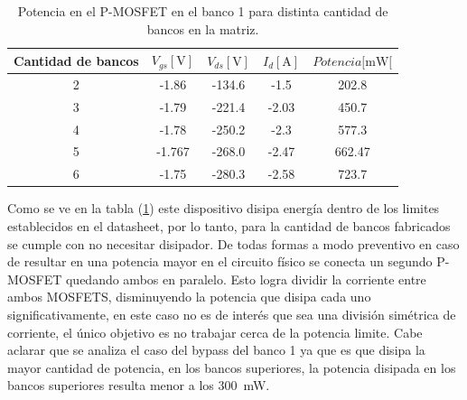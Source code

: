 \begin{table}[H]
\centering
\begin{tabular}{@{}ccccc@{}}
\toprule
Cantidad de bancos & $V_{gs} [\si{\volt}]$ & $V_{ds} [\si{\volt}]$ & $I_d  [\si{\ampere}]$ & $Potencia [\si{\milli \watt}[$ \\ \midrule
2                  & -1.86               & -134.6              & -1.5               & 202.8                        \\
3                  & -1.79               & -221.4              & -2.03              & 450.7                        \\
4                  & -1.78               & -250.2              & -2.3               & 577.3                        \\
5                  & -1.767              & -268.0              & -2.47              & 662.47                       \\
6                  & -1.75               & -280.3              & -2.58              & 723.7                        \\ \bottomrule
\end{tabular}
\caption{Potencia en el P-MOSFET en el banco 1 para distinta cantidad de bancos en la matriz.}
\label{tab:potencia}
\end{table}
 



Como se ve en la tabla (\ref{tab:potencia}) este dispositivo disipa energía dentro de los limites establecidos en el datasheet, por lo tanto, para la cantidad de bancos fabricados se cumple con no necesitar disipador. 
De todas formas a modo preventivo en caso de resultar en una potencia mayor en el circuito físico se conecta un segundo P-MOSFET quedando ambos en paralelo. Esto logra dividir la corriente entre ambos MOSFETS, disminuyendo la potencia que disipa cada uno significativamente, en este caso no es de interés que sea una división simétrica de corriente, el único objetivo es no trabajar cerca de la potencia limite. Cabe aclarar que se analiza el caso del bypass del banco 1 ya que es que disipa la mayor cantidad de potencia, en los bancos superiores, la potencia disipada en los bancos superiores resulta menor a los \SI{300}{\milli \watt}.




